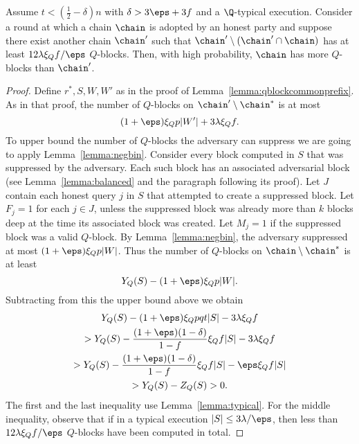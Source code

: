 \begin{lemma}\label{lemma:qblockcommonprefix12}
	Assume $t<(\frac12-\delta)n$ with $\delta>3\eps+3f$ and a $\Q$-typical
	execution.
	Consider a round at which a chain $\chain$ is adopted by an honest party and
	suppose there exist another chain $\chain'$ such that
	$\chain'\setminus(\chain'\cap\chain)$ has at least $12\lambda\xi_Qf/\eps$ $Q$-blocks.
	Then, with high probability, $\chain$ has more $Q$-blocks than $\chain'$.
\end{lemma}
\begin{proof}
	Define $r^*,S,W,W'$ as in the proof of
	Lemma~\ref{lemma:qblockcommonprefix}. As in that proof,
	the number of $Q$-blocks on $\chain'\setminus\chain^*$ is
	at most
	\[
		(1+\eps)\xi_Qp|W'|+3\lambda\xi_Qf
	.\]
	To upper bound the number of $Q$-blocks the adversary can suppress we
	are going to apply Lemma~\ref{lemma:negbin}.
	Consider every block computed in $S$ that was suppressed by the
	adversary. Each such block has an associated adversarial block (see
	Lemma~\ref{lemma:balanced} and the paragraph following its proof).
	Let $J$ contain each honest query $j$ in $S$ that attempted to create
	a suppressed block.
	Let $F_j=1$ for each $j\in J$, unless the suppressed block was already
	more than $k$ blocks deep at the time its associated block was
	created.
	Let $M_j=1$ if the suppressed block was a valid $Q$-block.
	By Lemma~\ref{lemma:negbin}, the adversary suppressed at most
	$(1+\eps)\xi_Qp|W|$. Thus
	the number of $Q$-blocks on $\chain\setminus\chain^*$ is at least
	\[
		Y_Q(S)-(1+\eps)\xi_Qp|W|
	.\]
	Subtracting from this the upper bound above we obtain
	\begin{multline*}
		Y_Q(S)-(1+\eps)\xi_Qpqt|S|-3\lambda\xi_Qf\\
		>Y_Q(S)-\frac{(1+\eps)(1-\delta)}{1-f}\xi_Qf|S|-3\lambda\xi_Qf\\
		>Y_Q(S)-\frac{(1+\eps)(1-\delta)}{1-f}\xi_Qf|S|-\eps\xi_Qf|S|\\
		>Y_Q(S)-Z_Q(S)>0
	.\end{multline*}
	The first and the last inequality use Lemma~\ref{lemma:typical}. For
	the middle inequality, observe that if in a typical execution
	$|S|\le3\lambda/\eps$, then less than $12\lambda\xi_Qf/\eps$ $Q$-blocks
	have been computed in total.
\Qed\end{proof}

